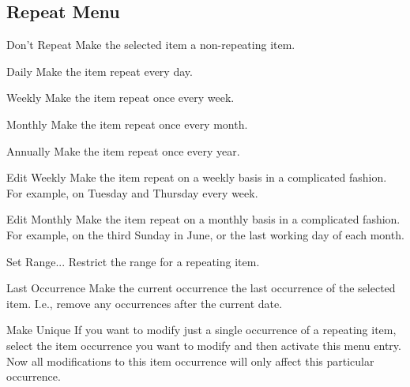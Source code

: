 \documentclass[a4paper,english]{article}
\begin{document}
    \subsection{Repeat Menu}
        \begin{Description}\setlength{\itemsep}{0cm}
        \item[Don't Repeat]
            Make the selected item a non-repeating item.

        \item[Daily]
            Make the item repeat every day.

        \item[Weekly]
            Make the item repeat once every week.

        \item[Monthly]
            Make the item repeat once every month.

        \item[Annually]
            Make the item repeat once every year.

        \item[Edit Weekly]
            Make the item repeat on a weekly basis in a complicated
            fashion.  For example, on Tuesday and Thursday every week.

        \item[Edit Monthly]
            Make the item repeat on a monthly basis in a complicated
            fashion.  For example, on the third Sunday in June, or the
            last working day of each month.

        \item[Set Range...]
            Restrict the range for a repeating item.

        \item[Last Occurrence]
            Make the current occurrence the last occurrence of the
            selected item.  I.e., remove any occurrences after the
            current date.

        \item[Make Unique]
            If you want to modify just a single occurrence of a
            repeating item, select the item occurrence you want to
            modify and then activate this menu entry.  Now all
            modifications to this item occurrence will only affect
            this particular occurrence.

        \end{Description}
\end{document}
